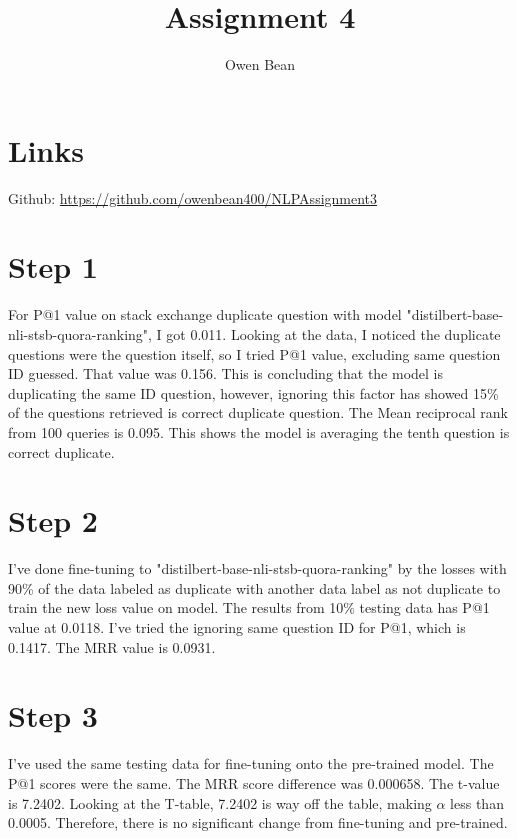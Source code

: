 \documentclass{article}
\title{Assignment 4}
\author{Owen Bean}
\begin{document}
\maketitle


\section{Links}

Github: \href{https://github.com/owenbean400/NLPAssignment3}{https://github.com/owenbean400/NLPAssignment3}

\section{Step 1}

For P@1 value on stack exchange duplicate question with model "distilbert-base-nli-stsb-quora-ranking", I got 0.011. Looking at the data, I noticed the duplicate questions were the question itself, so I tried P@1 value, excluding same question ID guessed. That value was 0.156. This is concluding that the model is duplicating the same ID question, however, ignoring this factor has showed 15\% of the questions retrieved is correct duplicate question. The Mean reciprocal rank from 100 queries is 0.095. This shows the model is averaging the tenth question is correct duplicate.

\section{Step 2}

I've done fine-tuning to "distilbert-base-nli-stsb-quora-ranking" by the losses with 90\% of the data labeled as duplicate with another data label as not duplicate to train the new loss value on model. The results from 10\% testing data has P@1 value at 0.0118. I've tried the ignoring same question ID for P@1, which is 0.1417. The MRR value is 0.0931.

\section{Step 3}

I've used the same testing data for fine-tuning onto the pre-trained model. The P@1 scores were the same. The MRR score difference was 0.000658. The t-value is 7.2402. Looking at the T-table, 7.2402 is way off the table, making \(\alpha\) less than 0.0005. Therefore, there is no significant change from fine-tuning and pre-trained.
\end{document}
